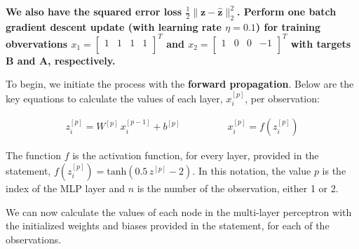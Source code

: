 \documentclass[12pt]{article}
\begin{document}
\begin{enumerate}[leftmargin=\labelsep]
        \vskip -0.5cm
        \textbf{We also have the squared error loss $\frac{1}{2} \|\mathbf{z} - \hat{\mathbf{z}}\|^{2}_{2}$. Perform one batch gradient descent update (with learning rate $\eta = 0.1$) for training
        obvervations $x_1 = \begin{bmatrix} 1 & 1 & 1 & 1 \\ \end{bmatrix}^T$ and $x_2 = \begin{bmatrix} 1 & 0 & 0 & -1 \\ \end{bmatrix}^T$ with targets B and A,
        respectively.}

        \vskip 0.3cm
        To begin, we initiate the process with the \textbf{forward propagation}. Below are the key equations to calculate the values of each
        layer, $x^{[p]}_i$, per observation:

        \vskip -0.2cm
        \begin{align*}
          z^{[p]}_i = W^{[p]} \, x^{[p-1]}_i + b^{[p]} & \qquad\qquad
          x^{[p]}_i = f\left(z^{[p]}_i\right)
        \end{align*}

        The function $f$ is the activation function, for every layer, provided in the statement, $f\left(z^{[p]}_i\right) = \text{tanh}\left(0.5\,z^{[p]} - 2\right)$.
        In this notation, the value $p$ is the index of the MLP layer and $n$ is the number of the observation, either 1 or 2.

        We can now calculate the values of each node in the multi-layer perceptron with the initialized weights and biases provided in the statement,
        for each of the observations.


\end{enumerate}
\end{document}
